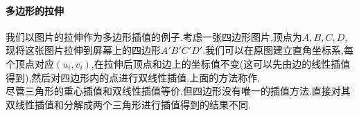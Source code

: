 \documentclass{ctexart}
\begin{document}
\paragraph{多边形的拉伸}
我们以图片的拉伸作为多边形插值的例子.考虑一张四边形图片,顶点为$A,B,C,D$,现将这张图片拉伸到屏幕上的四边形$A'B'C'D'$.我们可以在原图建立直角坐标系,每个顶点对应$\left(u_i,v_i\right)$,在拉伸后顶点和边上的坐标值不变(这可以先由边的线性插值得到),然后对四边形内的点进行双线性插值.上面的方法称作.\\
\indent 尽管三角形的重心插值和双线性插值等价,但四边形没有唯一的插值方法.直接对其双线性插值和分解成两个三角形进行插值得到的结果不同.
\end{document}
